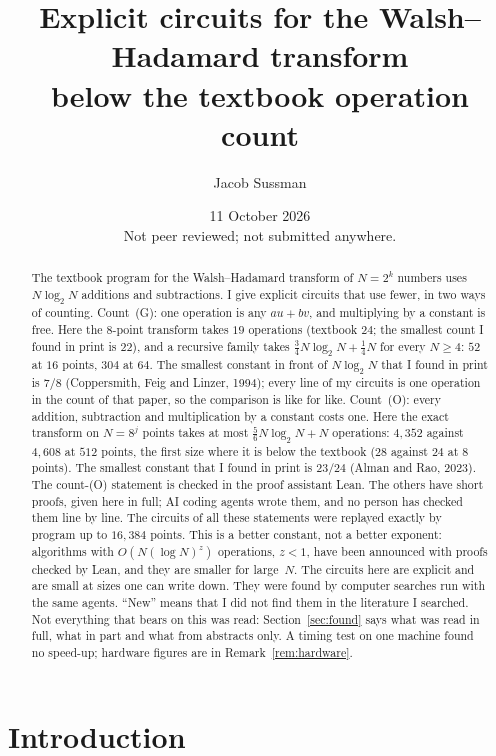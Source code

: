 \documentclass[10pt]{article}
\title{\vspace{-1.2cm}Explicit circuits for the Walsh--Hadamard transform\\ below the textbook operation count}
\author{Jacob Sussman}
\date{\vspace{-0.2cm}11 October 2026\\[3pt]{\normalsize Not peer reviewed; not submitted anywhere.}\vspace{-0.3cm}}
\theoremstyle{remark}
\newcommand{\cntG}{\textup{(G)}}
\newcommand{\cntO}{\textup{(O)}}
\renewcommand{\lg}{\log_2}
\begin{document}
\maketitle

\begin{abstract}
\noindent
The textbook program for the Walsh--Hadamard transform of $N=2^k$ numbers uses $N\lg N$ additions and
subtractions. I give explicit circuits that use fewer, in two ways of counting.
Count~\cntG: one operation is any $a u+b v$, and multiplying by a constant is free. Here the $8$-point
transform takes $19$ operations (textbook $24$; the smallest count I found in print is $22$), and a
recursive family takes $\tfrac34 N\lg N+\tfrac14 N$ for every $N\ge 4$: $52$ at $16$ points, $304$ at $64$.
The smallest constant in front of $N\lg N$ that I found in print is $7/8$ (Coppersmith, Feig and Linzer, 1994);
every line of my circuits is one operation in the count of that paper, so the comparison is like for like.
Count~\cntO: every addition, subtraction and multiplication by a constant costs one. Here the exact transform
on $N=8^j$ points takes at most $\tfrac56 N\lg N+N$ operations: $4{,}352$ against $4{,}608$ at $512$ points,
the first size where it is below the textbook ($28$ against $24$ at $8$ points).
The smallest constant that I found in print is $23/24$ (Alman and Rao, 2023).
The count-\cntO{} statement is checked in the proof assistant Lean. The others have short proofs, given here
in full; AI coding agents wrote them, and no person has checked them line by line. The circuits of all these
statements were replayed exactly by program up to $16{,}384$ points.
This is a better constant, not a better exponent: algorithms with $O(N(\log N)^{z})$ operations, $z<1$, have been
announced with proofs checked by Lean, and they are smaller for large~$N$. The circuits here are explicit and are small at sizes one can write
down. They were found by computer searches run with the same agents. ``New'' means that I did not find
them in the literature I searched. Not everything that bears on this was read:
Section~\ref{sec:found} says what was read in full, what in part and what from abstracts only.
A timing test on one machine found no speed-up; hardware figures are in Remark~\ref{rem:hardware}.
\end{abstract}

\section{Introduction}
\end{document}
